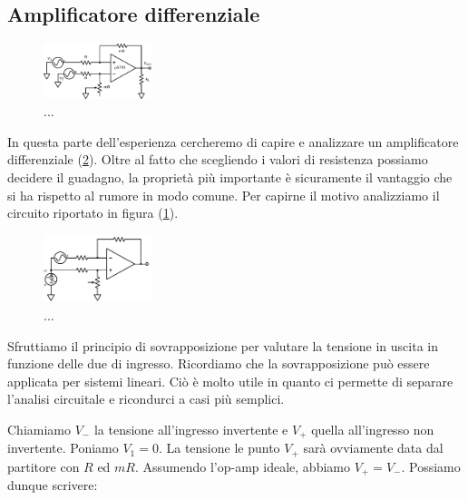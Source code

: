 \subsection{Amplificatore differenziale}

\begin{figure}
  \begin{center}
    \includegraphics[width=0.280\textwidth]{../E05/latex/c_teo_diff_amp.pdf}
  \end{center}
  \caption{...}
  \label{cir5:diff_amp_teo}
\end{figure}

In questa parte dell'esperienza cercheremo di capire e analizzare un amplificatore differenziale (\ref{cir5:diff_amp}). Oltre al fatto che scegliendo i valori di resistenza possiamo decidere il guadagno, la proprietà più importante è sicuramente il vantaggio che si ha rispetto al rumore in modo comune. Per capirne il motivo analizziamo il circuito riportato in figura (\ref{cir5:diff_amp_teo}).


\begin{figure}
  \begin{center}
    \includegraphics[width=0.280\textwidth]{../E05/latex/c_diff_amp.pdf}
  \end{center}
  \caption{...}
  \label{cir5:diff_amp}
\end{figure}



Sfruttiamo il principio di sovrapposizione per valutare la tensione in uscita in funzione delle due di ingresso. Ricordiamo che la sovrapposizione può essere applicata per sistemi lineari. Ciò è molto utile in quanto ci permette di separare l'analisi circuitale e ricondurci a casi più semplici.

Chiamiamo $V_-$ la tensione all'ingresso invertente e $V_+$ quella all'ingresso non invertente. Poniamo $V_1=0$. La tensione le punto $V_+$ sarà ovviamente data dal partitore con $R$ ed $mR$. Assumendo l'op-amp ideale, abbiamo $V_+=V_-$. Possiamo dunque scrivere:

